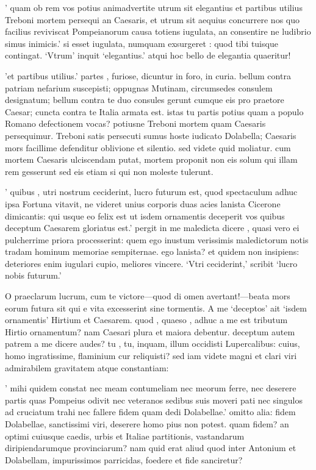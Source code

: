  ' quam ob rem vos potius animadvertite utrum sit elegantius et partibus utilius Treboni mortem persequi an Caesaris, et utrum sit aequius concurrere nos quo facilius reviviscat Pompeianorum causa totiens iugulata, an consentire ne ludibrio simus inimicis.' si esset iugulata, numquam exsurgeret : quod tibi tuisque contingat. `Vtrum' inquit `elegantius.' atqui hoc bello de elegantia quaeritur!

 'et partibus utilius.' partes , furiose, dicuntur in foro, in curia. bellum contra patriam nefarium suscepisti; oppugnas Mutinam, circumsedes consulem designatum; bellum contra te duo consules gerunt cumque eis pro praetore Caesar; cuncta contra te Italia armata est. istas tu partis potius quam a populo Romano defectionem vocas? potiusne Treboni mortem quam Caesaris persequimur. Treboni satis persecuti sumus hoste iudicato Dolabella; Caesaris mors facillime defenditur oblivione et silentio. sed videte quid moliatur. cum mortem Caesaris ulciscendam putat, mortem proponit non eis solum qui illam rem gesserunt sed eis etiam si qui non moleste tulerunt.

 ' quibus , utri nostrum ceciderint, lucro futurum est, quod spectaculum adhuc ipsa Fortuna vitavit, ne videret unius corporis duas acies lanista Cicerone dimicantis: qui usque eo felix est ut isdem ornamentis deceperit vos quibus deceptum Caesarem gloriatus est.' pergit in me maledicta dicere , quasi vero ei pulcherrime priora processerint: quem ego inustum verissimis maledictorum notis tradam hominum memoriae sempiternae. ego lanista? et quidem non insipiens: deteriores enim iugulari cupio, meliores vincere. `Vtri ceciderint,' scribit `lucro nobis futurum.'

 O praeclarum lucrum, cum te victore—quod di omen avertant!—beata mors eorum futura sit qui e vita excesserint sine tormentis. A me `deceptos' ait `isdem ornamentis' Hirtium et Caesarem. quod , quaeso , adhuc a me est tributum Hirtio ornamentum? nam Caesari plura et maiora debentur. deceptum autem patrem a me dicere audes? tu , tu, inquam, illum occidisti Lupercalibus: cuius, homo ingratissime, flaminium cur reliquisti? sed iam videte magni et clari viri admirabilem gravitatem atque constantiam:

 ' mihi quidem constat nec meam contumeliam nec meorum ferre, nec deserere partis quas Pompeius odivit nec veteranos sedibus suis moveri pati nec singulos ad cruciatum trahi nec fallere fidem quam dedi Dolabellae.' omitto alia: fidem Dolabellae, sanctissimi viri, deserere homo pius non potest. quam fidem? an optimi cuiusque caedis, urbis et Italiae partitionis, vastandarum diripiendarumque provinciarum? nam quid erat aliud quod inter Antonium et Dolabellam, impurissimos parricidas, foedere et fide sanciretur?

